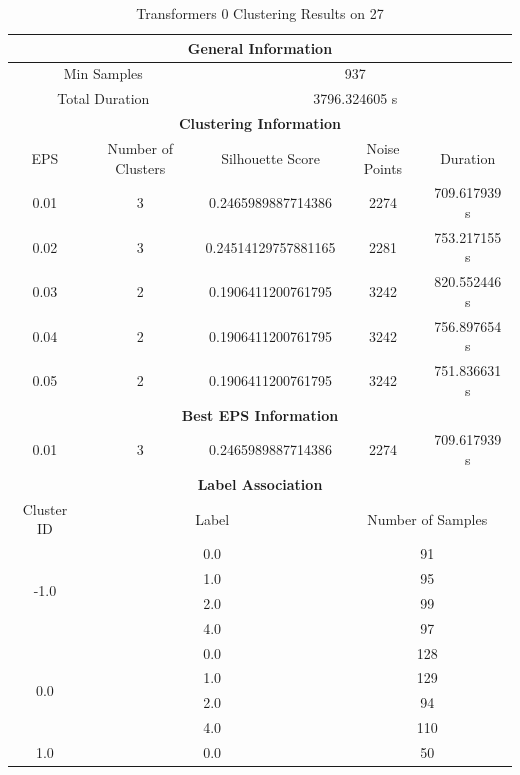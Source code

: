 \begin{longtable}{|c|c|c|c|c|}
\caption{Transformers 0 Clustering Results on 27} \label{tab:27_transformers_0_clustering_results}\\
\hline
\multicolumn{5}{|c|}{\textbf{General Information}} \\
\hline
\multicolumn{2}{|c|}{Min Samples} & \multicolumn{3}{c|}{937} \\
\multicolumn{2}{|c|}{Total Duration} & \multicolumn{3}{c|}{3796.324605 s} \\
\hline
\multicolumn{5}{|c|}{\textbf{Clustering Information}} \\
\hline
EPS & Number of Clusters & Silhouette Score & Noise Points & Duration \\
0.01 & 3 & 0.2465989887714386 & 2274 & 709.617939 s\\
0.02 & 3 & 0.24514129757881165 & 2281 & 753.217155 s\\
0.03 & 2 & 0.1906411200761795 & 3242 & 820.552446 s\\
0.04 & 2 & 0.1906411200761795 & 3242 & 756.897654 s\\
0.05 & 2 & 0.1906411200761795 & 3242 & 751.836631 s\\
\hline
\multicolumn{5}{|c|}{\textbf{Best EPS Information}} \\
\hline
0.01 & 3 & 0.2465989887714386 & 2274 & 709.617939 s\\
\hline
\multicolumn{5}{|c|}{\textbf{Label Association}} \\
\hline
Cluster ID & \multicolumn{2}{c|}{Label} & \multicolumn{2}{c|}{Number of Samples} \\
\hline
\multirow{4}{*}{-1.0} & \multicolumn{2}{c|}{0.0} & \multicolumn{2}{c|}{91} \\
& \multicolumn{2}{c|}{1.0} & \multicolumn{2}{c|}{95} \\
& \multicolumn{2}{c|}{2.0} & \multicolumn{2}{c|}{99} \\
& \multicolumn{2}{c|}{4.0} & \multicolumn{2}{c|}{97} \\
\hline
\multirow{4}{*}{0.0} & \multicolumn{2}{c|}{0.0} & \multicolumn{2}{c|}{128} \\
& \multicolumn{2}{c|}{1.0} & \multicolumn{2}{c|}{129} \\
& \multicolumn{2}{c|}{2.0} & \multicolumn{2}{c|}{94} \\
& \multicolumn{2}{c|}{4.0} & \multicolumn{2}{c|}{110} \\
\hline
\multirow{4}{*}{1.0} & \multicolumn{2}{c|}{0.0} & \multicolumn{2}{c|}{50} \\

\end{longtable}

